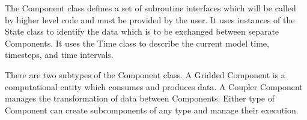 %


The Component class defines a set of subroutine interfaces which
will be called by higher level code and must be provided by the user.
It uses instances of the State class to identify the data which is
to be exchanged between separate Components.  It uses the Time class
to describe the current model time, timesteps, and time intervals.


There are two subtypes of the Component class.  
A Gridded Component is a computational entity which
consumes and produces data.  A Coupler Component manages the
transformation of data between Components.
Either type of Component can create subcomponents of any
type and manage their execution.


